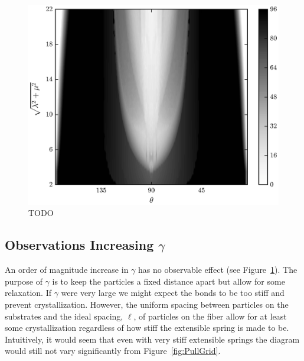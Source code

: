 	\begin{figure}[t]
		\begin{center}
			\includegraphics{./fig/ch3/push/g1000/grid.eps}
		\end{center}		
		\caption{ TODO
		\label{fig:PushGrid:g1000}}
	\end{figure}	

\subsection{Observations Increasing $\gamma$}

An order of magnitude increase in $\gamma$ has no observable effect (see Figure~\ref{fig:PushGrid:g1000}). The purpose of $\gamma$ is to keep the particles a fixed distance apart but allow for some relaxation. If $\gamma$ were very large we might expect the bonds to be too stiff and prevent crystallization. However, the uniform spacing between particles on the substrates and the ideal spacing, $\ell$, of particles on the fiber allow for at least some crystallization regardless of how stiff the extensible spring is made to be. Intuitively, it would seem that even with very stiff extensible springs the diagram would still not vary significantly from Figure~\ref{fig:PullGrid}.

